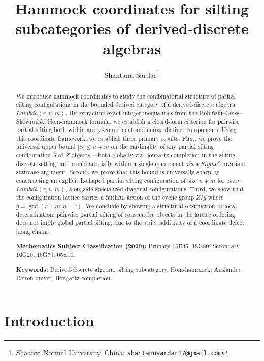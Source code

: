 \documentclass[11pt, a4paper]{article}
\title{Hammock coordinates for silting subcategories of derived-discrete algebras}
\author{Shantanu Sardar\thanks{Shaanxi Normal University, China;
  \texttt{shantanusardar17@gmail.com}}}
\date{}
\theoremstyle{definition}
\def\Lambda{Lambda}%
\def\Sigma{Sigma}%
\def\ss{ss}%
\def\mathbb#1{#1}%
\def\mathcal#1{#1}%
\begin{document}
\maketitle

\begin{abstract}
We introduce hammock coordinates to study the combinatorial structure of partial silting configurations in the bounded derived category of a derived-discrete algebra $\Lambda(r,n,m)$. By extracting exact integer inequalities from the Bobi\'nski--Gei\ss{}--Skowro\'nski Hom-hammock formula, we establish a closed-form criterion for pairwise partial silting both within any $\mathcal Z$-component and across distinct components. Using this coordinate framework, we establish three primary results. First, we prove the universal upper bound $|S| \le n+m$ on the cardinality of any partial silting configuration $S$ of $\mathcal Z$-objects
---both globally via Bongartz completion in the silting-discrete setting, and combinatorially within a single component via a $\Sigma^r$-invariant staircase argument. Second, we prove that this bound is universally sharp by constructing an explicit L-shaped partial silting configuration of size $n+m$ for every $\Lambda(r,n,m)$, alongside specialized diagonal configurations. Third, we show that the configuration lattice carries a faithful action of the cyclic group $\mathbb Z/g$ where $g = \gcd(r+m, n-r)$. We conclude by showing a structural obstruction to local determination: pairwise partial silting of consecutive objects in the lattice ordering does not imply global partial silting, due to the strict additivity of a coordinate defect along chains.

\medskip\noindent
\textbf{Mathematics Subject Classification (2020):} Primary 16E35, 18G80; Secondary 16G20, 16G70, 05E10.

\smallskip\noindent
\textbf{Keywords:} Derived-discrete algebra, silting subcategory, Hom-hammock, Auslander--Reiten quiver, Bongartz completion.
\end{abstract}


\section{Introduction}
\label{sec:intro}
\end{document}
